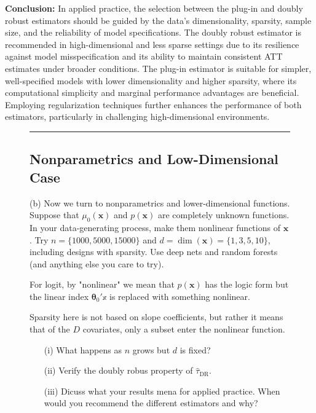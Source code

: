 \documentclass{article}
\newenvironment{colorparagraph}[1]{\par\color{#1}}{\par}
\begin{document}
\textbf{Conclusion:}
In applied practice, the selection between the plug-in and doubly robust estimators should be guided by the data's dimensionality, sparsity, sample size, and the reliability of model specifications. The doubly robust estimator is recommended in high-dimensional and less sparse settings due to its resilience against model misspecification and its ability to maintain consistent ATT estimates under broader conditions. The plug-in estimator is suitable for simpler, well-specified models with lower dimensionality and higher sparsity, where its computational simplicity and marginal performance advantages are beneficial. Employing regularization techniques further enhances the performance of both estimators, particularly in challenging high-dimensional environments.

\begin{figure}[H]
  \begin{colorparagraph}{questioncolor}
  \rule{\textwidth}{0.5pt}
  \label{q2b}
  \subsection{Nonparametrics and Low-Dimensional Case}

  (b) Now we turn to nonparametrics and lower-dimensional functions. Suppose that \( \mu_0(\mathbf{x}) \) and \( p(\mathbf{x}) \) are completely unknown functions. In your data-generating process, make them nonlinear functions of \( \mathbf{x} \). Try \( n = \{1000, 5000, 15000\} \) and \( d = \dim(\mathbf{x}) = \{1, 3, 5, 10\} \), including designs with sparsity. Use deep nets and random forests (and anything else you care to try).

  For logit, by "nonlinear" we mean that $p(\mathbf{x})$ has the logic form but the linear index $\boldsymbol{\theta}_{0}'\mathbb{x}$ is replaced with something nonlinear.

  Sparsity here is not based on slope coefficients, but rather it means that of the $D$ covariates, only a subset enter the nonlinear function.

  \begin{itemize}
    \item[(i)] What happens as \( n \) grows but \( d \) is fixed?
    \item[(ii)] Verify the doubly robus property of $\hat{\tau}_{\text{DR}}$.
    \item[(iii)] Dicuss what your results mena for applied practice. When would you recommend the different estimators and why?
  \end{itemize}
\end{colorparagraph}  
\end{figure}
\end{document}
